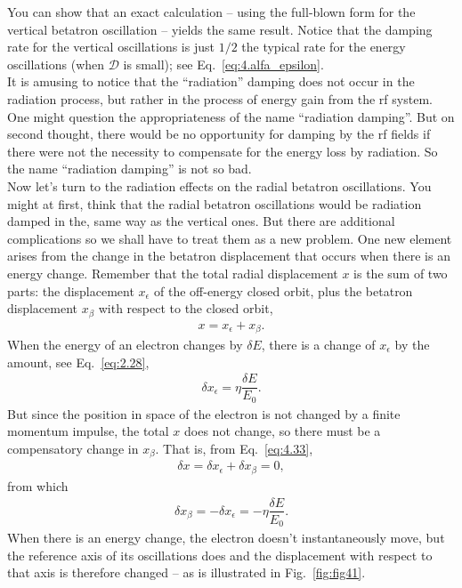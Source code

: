 You can show that an exact calculation -- using the full-blown form for the vertical betatron oscillation -- yields the same result. Notice that the damping rate for the vertical oscillations
 is just $1/2$ the typical rate for the energy oscillations (when $\mathscr{D}$ is small); see Eq.~\eqref{eq:4.alfa_epsilon}.\\
It is amusing to notice that the ``radiation'' damping does not occur in the radiation process, but rather in the process of energy gain from the rf system. One might question the appropriateness of the name ``radiation damping''. But on second thought, there would be no opportunity for damping by the rf fields if there were not the necessity to compensate for the energy loss by radiation. So the name ``radiation damping'' is not so bad.\\
Now let’s turn to the radiation effects on the radial betatron oscillations. You might at first,
 think that the radial betatron oscillations would be radiation damped in the, same way as the vertical ones. But there are additional complications so we shall have to treat them as a new problem. One new element arises from the change in the betatron displacement that occurs when there is an energy change. Remember that the total radial displacement $x$ is the sum of two parts: the displacement $x_\epsilon$ of the off-energy closed orbit, plus the betatron displacement $x_\beta$ with respect to the closed orbit,
\begin{align} \label{eq:4.33}
	x = x_\epsilon + x_\beta.
\end{align}
When the energy of an electron changes by $\delta E$, there is a change of $x_\epsilon$ by the
amount, see Eq.~\eqref{eq:2.28},
\begin{align}
	\delta x_\epsilon = \eta \dfrac{\delta E}{E_0}.
\end{align}
But since the position in space of the electron is not changed by a finite momentum impulse,
 the total $x$ does not change, so there must be a compensatory change in $x_\beta$. That is, from Eq.~\eqref{eq:4.33},
\begin{align*}
	\delta x = \delta x_\epsilon + \delta x_\beta = 0,
\end{align*}
from which
\begin{align} \label{eq:4.35}
	\delta x_\beta = -\delta x_\epsilon = -\eta \dfrac{\delta E}{E_0}.
\end{align}
When there is an energy change, the electron doesn't instantaneously move, but the reference
 axis of its oscillations does and the displacement with respect to that axis is therefore changed -- as is illustrated in Fig.~\ref{fig:fig41}.

